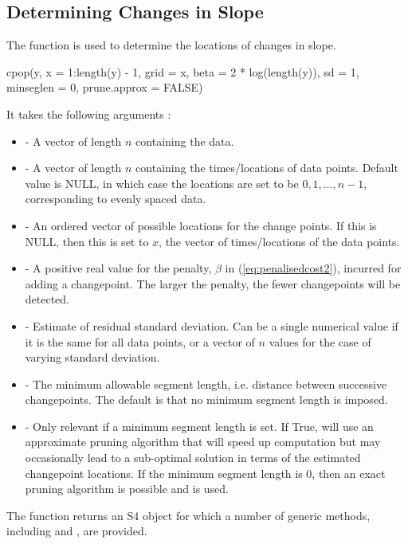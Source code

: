 \documentclass[nojss]{jss}
\begin{document}
\subsection{Determining Changes in Slope}
%
%
The function  is used to determine the locations of changes in slope.
%
%
\begin{CodeInput}
cpop(y, x = 1:length(y) - 1, grid = x, beta = 2 * log(length(y)), 
    sd = 1, minseglen = 0, prune.approx = FALSE)
\end{CodeInput}
It takes the following arguments :
%
%
\begin{itemize}
 \item  {} - A vector of length $n$ containing the data.
\item {} -  A vector of length $n$ containing the times/locations of data points. Default value is NULL, in which case the locations are set to be $0,1,\ldots,n-1$, corresponding to evenly spaced data.
\item {} -  An ordered vector of possible locations for the change points. If this is NULL, then this is set to $x$, the vector of times/locations of the data points.
\item {} -  A positive real value for the penalty, $\beta$ in (\ref{eq:penalisedcost2}), incurred for adding a changepoint. The larger the penalty, the fewer changepoints will be detected.
\item {} - Estimate of residual standard deviation. Can be a single numerical value if it is the same for all data points, or a vector of $n$ values for the case of varying standard deviation. 
\item {} -  The minimum allowable segment length, i.e. distance between successive changepoints. The default is that no minimum segment length is imposed.
\item {} -  Only relevant if a minimum segment length is set. If True,  will use an approximate pruning algorithm that will speed up computation but may occasionally lead to a sub-optimal solution in terms of the estimated changepoint locations. If the minimum segment length is 0, then an exact pruning algorithm is possible and is used.
\end{itemize}
The  function returns an S4 object for which a number of generic methods, including  and , are provided. 
%
%
\end{document}
